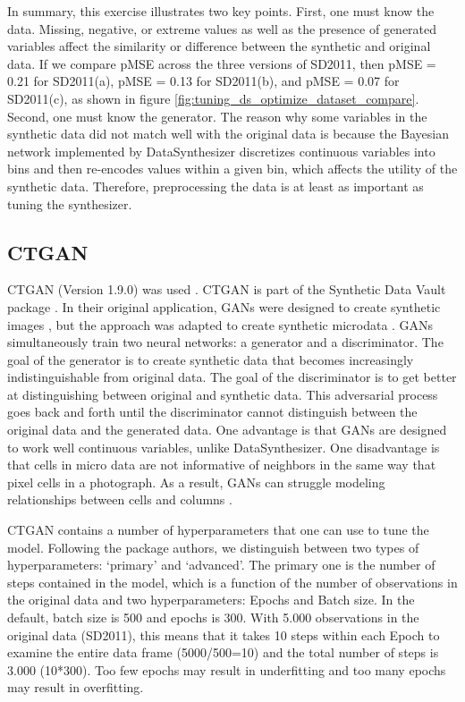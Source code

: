\documentclass[runningheads]{llncs}
\begin{document}
In summary, this exercise illustrates two key points.  First, one must know the data.  Missing, negative, or extreme values as well as the presence of generated variables affect the similarity or difference between the synthetic and original data.  If we compare pMSE across the three versions of SD2011, then  pMSE = 0.21 for SD2011(a), pMSE = 0.13 for SD2011(b), and pMSE = 0.07 for SD2011(c), as shown in figure \ref{fig:tuning_ds_optimize_dataset_compare}.  Second, one must know the generator.  The reason why some variables in the synthetic data did not match well with the original data is because the Bayesian network implemented by DataSynthesizer discretizes continuous variables into bins and then re-encodes values within a given bin, which affects the utility of the synthetic data.  Therefore, preprocessing the data is at least as important as tuning the synthesizer.

\subsection{CTGAN} 

CTGAN (Version 1.9.0) was used \cite{ctgan}.  CTGAN is part of the Synthetic Data Vault package \cite{patki2016synthetic}.  In their original application, GANs were designed to create synthetic images  \cite{goodfellow2014generative}, but the approach was adapted to create synthetic microdata \cite{park2018data}.  GANs simultaneously train two neural networks: a generator and a discriminator. The goal of the generator is to create synthetic data that becomes increasingly indistinguishable from original data.  The goal of the discriminator is to get better at distinguishing between original and synthetic data.  This adversarial process goes back and forth until the discriminator cannot distinguish between the original data and the generated data.  One advantage is that GANs are designed to work well continuous variables, unlike DataSynthesizer.  One disadvantage is that cells in micro data are not informative of neighbors in the same way that pixel cells in a photograph. As a result, GANs can struggle modeling relationships between cells and columns \cite{drechsler202330}.

CTGAN contains a number of hyperparameters that one can use to tune the model. Following the package authors, we distinguish between two types of hyperparameters: `primary' and `advanced'.  The primary one is the number of steps contained in the model, which is a function of the number of observations in the original data and two hyperparameters: Epochs and Batch size.  In the default, batch size is 500 and epochs is 300.  With 5.000 observations in the original data (SD2011), this means that it takes 10 steps within each Epoch to examine the entire data frame (5000/500=10) and the total number of steps is 3.000 (10*300).  Too few epochs may result in underfitting and too many epochs may result in overfitting.
\end{document}
